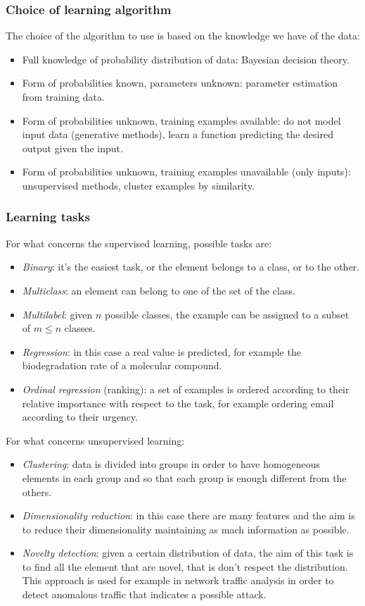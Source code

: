 \subsubsection{Choice of learning algorithm}
The choice of the algorithm to use is based on the knowledge we have of the data:
\begin{itemize}
	\item Full knowledge of probability distribution of data: Bayesian decision theory.
	\item Form of probabilities known, parameters unknown: parameter estimation from training data.
	\item Form of probabilities unknown, training examples available: do not model input data (generative methods), learn a function predicting the desired output given the input.
	\item Form of probabilities unknown, training examples unavailable (only inputs): unsupervised methods, cluster examples by similarity.
\end{itemize}
\subsubsection{Learning tasks}
For what concerns the supervised learning, possible tasks are: 
\begin{itemize}
	\item \textit{Binary}: it's the easiest task, or the element belongs to a class, or to the other.
	\item \textit{Multiclass}: an element can belong to one of the set of the class.
	\item \textit{Multilabel}: given $n$ possible classes, the example can be assigned to a subset of $m\leq n$ classes.
	\item \textit{Regression}: in this case a real value is predicted, for example the biodegradation rate of a molecular compound.
	\item \textit{Ordinal regression} (ranking): a set of examples is ordered according to their relative importance with respect to the task, for example ordering email according to their urgency.
\end{itemize}
For what concerns unsupervised learning:
\begin{itemize}
	\item \textit{Clustering}: data is divided into groups in order to have homogeneous elements in each group and so that each group is enough different from the others.
	\item \textit{Dimensionality reduction}: in this case there are many features and the aim is to reduce their dimensionality maintaining as mach information as possible.
	\item \textit{Novelty detection}: given a certain distribution of data, the aim of this task is to find all the element that are novel, that is don't respect the distribution. This approach is used for example in network traffic analysis in order to detect anomalous traffic that indicates a possible attack.
\end{itemize}
%
%
